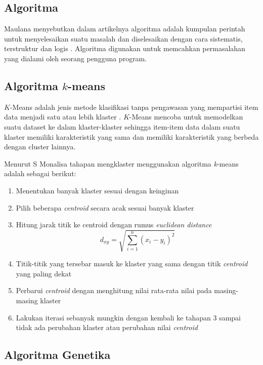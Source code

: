 \subsection{Algoritma}

Maulana menyebutkan dalam artikelnya algoritma adalah kumpulan perintah untuk menyelesaikan suatu masalah dan diselesaikan dengan cara sistematis, terstruktur dan logis \cite{maulana2017pembelajaran}. Algoritma digunakan untuk memcahkan permasalahan yang dialami oleh seorang pengguna program.

\subsection{Algoritma $k$-means}

$K$-Means adalah jenis metode klasifikasi tanpa pengawasan yang mempartisi item data menjadi satu atau lebih klaster \cite{agusta2007k}. $K$-Means mencoba untuk memodelkan suatu dataset ke dalam klaster-klaster sehingga item-item data dalam suatu klaster memiliki karakteristik yang sama dan memiliki karakteristik yang berbeda dengan cluster lainnya.

Menurut S Monalisa \cite{monalisa2018klasterisasi} tahapan mengklaster menggunakan algoritma \textit{k}-means adalah sebagai berikut:

\begin{enumerate}
	\item Menentukan banyak klaster sesuai dengan keinginan
	\item Pilih beberapa \textit{centroid} secara acak sesuai banyak klaster
	\item Hitung jarak titik ke centroid dengan rumus \textit{euclidean distance}
	\begin{equation}
	d_{xy}=\sqrt{\sum_{i=1}^{n}(x_i-y_i)^{2}}
	\end{equation}
	\item Titik-titik yang tersebar masuk ke klaster yang sama dengan titik \textit{centroid} yang paling dekat
	\item Perbarui \textit{centroid} dengan menghitung nilai rata-rata nilai pada masing-masing klaster
	\item Lakukan iterasi sebanyak mungkin dengan kembali ke tahapan 3 sampai tidak ada perubahan klaster atau perubahan nilai \textit{centroid}
\end{enumerate}

\subsection{Algoritma Genetika}

